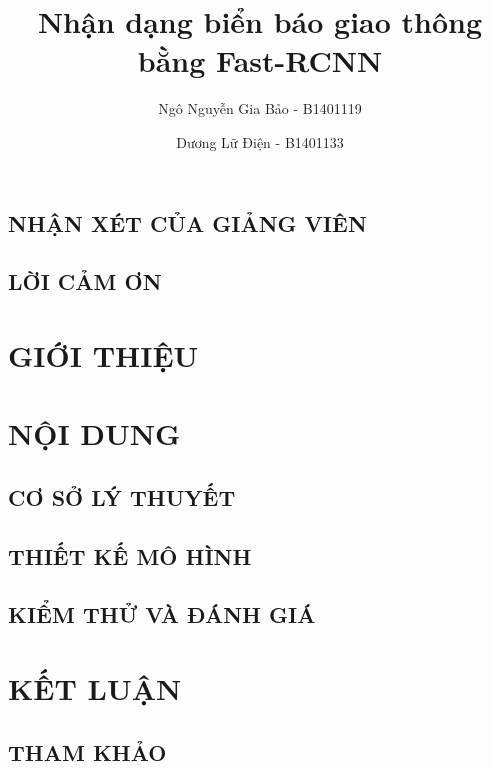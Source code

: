 \documentclass[a4paper,12pt,oneside]{report}	%
\title{Nhận dạng biển báo giao thông bằng Fast-RCNN}		%
\author{Ngô Nguyễn Gia Bảo - B1401119 \and Dương Lữ Điện - B1401133}				%
\begin{document}


\chapter*{NHẬN XÉT CỦA GIẢNG VIÊN}


\chapter*{LỜI CẢM ƠN}


\tableofcontents
\listoffigures
\listoftables


\part{GIỚI THIỆU}



\part{NỘI DUNG}

\chapter{CƠ SỞ LÝ THUYẾT}

\chapter{THIẾT KẾ MÔ HÌNH}


\chapter{KIỂM THỬ VÀ ĐÁNH GIÁ}

\part{KẾT LUẬN}


\chapter*{THAM KHẢO}

\end{document}
